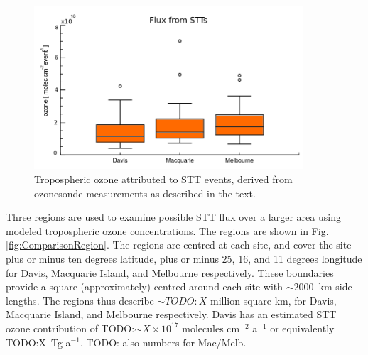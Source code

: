 \documentclass[acp, manuscript]{copernicus} %
\begin{document}
    \begin{figure}
      \includegraphics[width=10cm]{figures/flux_absolute.png}
      \caption{Tropospheric ozone attributed to STT events, derived from ozonesonde measurements as described in the text.}
      \label{fig:fluxsummaryabs}
    \end{figure}
    
    Three regions are used to examine possible STT flux over a larger area using modeled tropospheric ozone concentrations.
    The regions are shown in Fig. \ref{fig:ComparisonRegion}.
    The regions are centred at each site, and cover the site plus or minus ten degrees latitude, plus or minus 25, 16, and 11 degrees longitude for Davis, Macquarie Island, and Melbourne respectively. 
    These boundaries provide a square (approximately) centred around each site with $\sim 2000$~km side lengths.
    The regions thus describe $\sim TODO:X$ million square km, for Davis, Macquarie Island, and Melbourne respectively.
    Davis has an estimated STT ozone contribution of TODO:$\sim X \times 10^{17}$ molecules cm$^{-2}$ a$^{-1}$ or equivalently TODO:X~Tg a$^{-1}$.
    TODO: also numbers for Mac/Melb.
    
\end{document}
